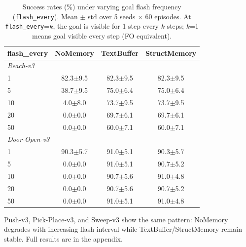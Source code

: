 \begin{table}[t]
\centering
\caption{Success rates (\%) under varying goal flash frequency (\texttt{flash\_every}). Mean $\pm$ std over 5 seeds $\times$ 60 episodes. At \texttt{flash\_every}=$k$, the goal is visible for 1 step every $k$ steps; $k$=1 means goal visible every step (FO equivalent).}
\label{tab:flash_every}
\begin{tabular}{l ccc}
\toprule
flash\_every & NoMemory & TextBuffer & StructMemory \\
\midrule
\multicolumn{4}{l}{\textit{Reach-v3}} \\
1  & 82.3$\pm$9.5 & 82.3$\pm$9.5 & 82.3$\pm$9.5 \\
5  & 38.7$\pm$9.5 & 75.0$\pm$6.4 & 75.0$\pm$6.4 \\
10 & 4.0$\pm$8.0 & 73.7$\pm$9.5 & 73.7$\pm$9.5 \\
20 & 0.0$\pm$0.0 & 69.7$\pm$6.1 & 69.7$\pm$6.1 \\
50 & 0.0$\pm$0.0 & 60.0$\pm$7.1 & 60.0$\pm$7.1 \\
\midrule
\multicolumn{4}{l}{\textit{Door-Open-v3}} \\
1  & 90.3$\pm$5.7 & 91.0$\pm$5.1 & 90.3$\pm$5.7 \\
5  & 0.0$\pm$0.0 & 91.0$\pm$5.1 & 90.7$\pm$5.2 \\
10 & 0.0$\pm$0.0 & 90.7$\pm$5.6 & 91.0$\pm$4.8 \\
20 & 0.0$\pm$0.0 & 90.7$\pm$5.6 & 90.7$\pm$5.2 \\
50 & 0.0$\pm$0.0 & 91.0$\pm$5.1 & 91.0$\pm$4.8 \\
\bottomrule
\end{tabular}
\begin{flushleft}
\footnotesize Push-v3, Pick-Place-v3, and Sweep-v3 show the same pattern: NoMemory degrades with increasing flash interval while TextBuffer/StructMemory remain stable. Full results are in the appendix.
\end{flushleft}
\end{table}
